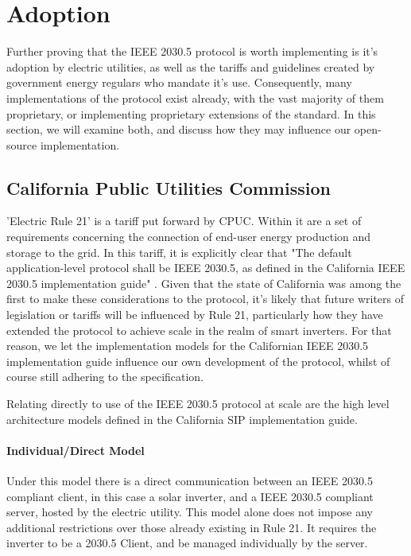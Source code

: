 \chapter{Adoption}\label{ch:adoption}

Further proving that the IEEE 2030.5 protocol is worth implementing is it's adoption by electric utilities, as well as the tariffs and guidelines created by government energy regulars who mandate it's use.
Consequently, many implementations of the protocol exist already, with the vast majority of them proprietary, or implementing proprietary extensions of the standard.
In this section, we will examine both, and discuss how they may influence our open-source implementation. 

\section{California Public Utilities Commission}
'Electric Rule 21' is a tariff put forward by CPUC. Within it are a set of requirements concerning the connection of end-user energy production and storage to the grid. In this tariff, it is explicitly clear that
"The default application-level protocol shall be IEEE 2030.5, as defined in the California IEEE 2030.5 implementation guide" \cite[]{Rule21}.
Given that the state of California was among the first to make these considerations to the protocol, it's likely that future writers of legislation or tariffs will be influenced by Rule 21, particularly how they have extended the protocol to achieve scale in the realm of smart inverters.
For that reason, we let the implementation models for the Californian IEEE 2030.5 implementation guide influence our own development of the protocol, whilst of course still adhering to the specification.

Relating directly to use of the IEEE 2030.5 protocol at scale are the high level architecture models defined in the California SIP implementation guide.

\subsubsection{Individual/Direct Model}
Under this model there is a direct communication between an IEEE 2030.5 compliant client, in this case a solar inverter, and a IEEE 2030.5 compliant server, hosted by the electric utility.
This model alone does not impose any additional restrictions over those already existing in Rule 21. It requires the inverter to be a 2030.5 Client, and be managed individually by the server.

